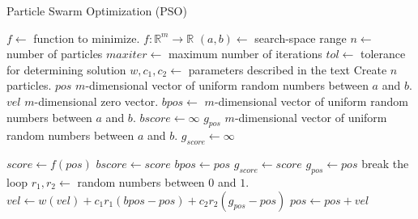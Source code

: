 \begin{algorithm}[!h]
    \caption{Particle Swarm Optimization (PSO)}
    \label{alg:pso}
    \begin{algorithmic}[1]
        \Statex $f \gets$ function to minimize. $f: \mathbb{R}^{m} \rightarrow \mathbb{R}$  
        \Statex $(a, b) \gets$ search-space range
        \Statex $n \gets$ number of particles
        \Statex $maxiter \gets$ maximum number of iterations
        \Statex $tol \gets$ tolerance for determining solution
        \Statex $w, c_{1}, c_{2} \gets$ parameters described in the text
        \State Create $n$ particles.
            \State $pos$ $m$-dimensional vector of uniform random numbers between $a$ and $b$.
            \State $vel$ $m$-dimensional zero vector.
            \State $bpos \gets$ $m$-dimensional vector of uniform random numbers between $a$ and $b$.
            \State $bscore \gets \infty$
        \EndFor
        \State $g_{pos}$ $m$-dimensional vector of uniform random numbers between $a$ and $b$.
        \State $g_{score} \gets \infty$

                \State $score \gets f(pos)$ 
                    \State $bscore \gets score$
                    \State $bpos \gets pos$
                \EndIf
                    \State $g_{score} \gets score$
                    \State $g_{pos} \gets pos$
                \EndIf
            \EndFor
                \State break the loop
            \EndIf
                \State $r_{1}, r_{2} \gets$ random numbers between $0$ and $1$.
                \State $vel \gets w(vel) + c_{1}r_{1}(bpos-pos) + c_{2}r_{2}(g_{pos}-pos)$
                \State $pos \gets pos + vel$
            \EndFor
        \EndFor
    \end{algorithmic}
\end{algorithm}


